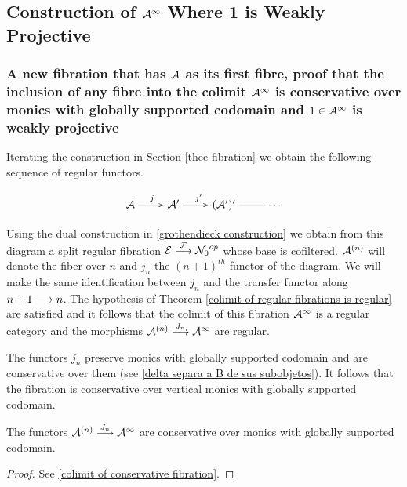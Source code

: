 \subsection{Construction of $\mathcal{A}^{\infty}$ Where 1 is Weakly Projective}



\subsubsection{A new fibration that has $\mathcal{A}$ as its first fibre, proof that the inclusion of any fibre into the colimit $\mathcal{A}^{\infty}$ is conservative over monics with globally supported codomain and $1 \in \mathcal{A}^{\infty}$ is weakly projective } \label{A infinito}

Iterating the construction in Section \ref{thee fibration} we obtain the following sequence of regular functors.


\[
\xymatrix{\cc{A} \ar[r]^{j} & \cc{A'} \ar[r]^{j'} & \cc{(A')'} \ar@{-}[r] & \cdots }
\]

\noindent Using the dual construction  in \ref{grothendieck construction} we obtain from this diagram  a split regular fibration $\mathcal{E} \overset {\mathcal{F}} {\longrightarrow} {\mathcal{N}_0}^{op}$ whose base is cofiltered. $\mathcal{A}^{(n)}$ will denote the fiber over $n$ and $j_n$ the $(n+1)^{th}$ functor of the diagram. We will make the same identification between $j_n$ and the transfer functor along $n+1 \overset {} {\longrightarrow} n$. The hypothesis of Theorem \ref{colimit of regular fibrations is regular} are satisfied and it follows that the colimit of this fibration $\mathcal{A}^\infty$ is a  regular category and the morphisms ${\mathcal{A}^{(n)} \overset {J_n} {\longrightarrow} \mathcal{A}^\infty}$ are regular.

\begin{remark}
The functors $j_n$ preserve monics with globally supported codomain and are conservative over them (see \ref{delta separa a B de sus subobjetos}). It follows that the fibration is conservative over vertical monics with globally supported codomain.
\end{remark}

\begin{corollary}\label{reflejans isos que son monoss}
The functors ${\mathcal{A}^{(n)} \overset {J_n} {\longrightarrow} \mathcal{A}^\infty}$ are conservative over monics with globally supported codomain.
\end{corollary}

\begin{proof}
See \ref{colimit of conservative fibration}.
\end{proof}


